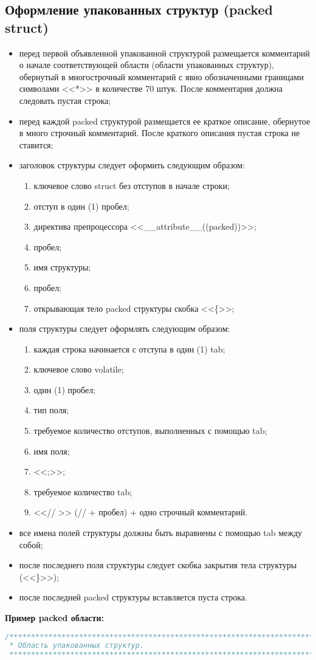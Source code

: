 \subsection{Оформление упакованных структур (packed struct)}
\begin{itemize}
	\item перед первой объявленной упакованной структурой размещается комментарий о начале соответствующей области (области упакованных структур), обернутый в многострочный комментарий с явно обозначенными границами символами <<*>> в количестве 70 штук. После комментария должна следовать  пустая строка;
	\item перед каждой packed структурой размещается ее краткое описание, обернутое в много строчный комментарий. После краткого описания пустая строка не ставится;
	\item заголовок структуры следует оформить следующим образом:
	\begin{enumerate}
		\item ключевое слово struct без отступов в начале строки;
		\item отступ в один (1) пробел;
		\item директива препроцессора <<\_\_attribute\_\_((packed))>>;
		\item пробел;
		\item имя структуры;
		\item пробел;
		\item открывающая тело packed структуры скобка <<\{>>;
	\end{enumerate}
	\item поля структуры следует оформлять следующим образом:
	\begin{enumerate}
		\item каждая строка начинается с отступа в один (1) tab;
		\item ключевое слово volatile;
		\item один (1) пробел;
		\item тип поля;
		\item требуемое количество отступов, выполненных с помощью tab;
		\item имя поля;
		\item <<;>>;
		\item требуемое количество tab;
		\item <<// >> (// + пробел) + одно строчный комментарий.
	\end{enumerate}
	\item все имена полей структуры должны быть выравнены с помощью tab между собой;
	\item после последнего поля структуры следует скобка закрытия тела структуры (<<\}>>);
	\item после последней packed структуры вставляется пуста строка.
\end{itemize}\textbf{Пример packed области:}\begin{lstlisting}[language=C++, frame=tlBR, basicstyle=\fontsize{10}{10}\ttfamily]
/**********************************************************************
 * Область упакованных структур.
 **********************************************************************/


\end{lstlisting}
